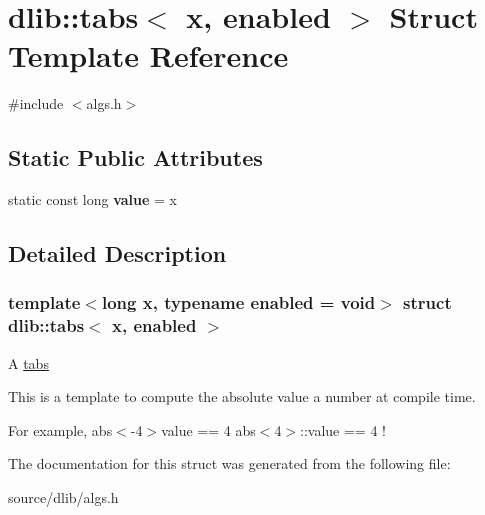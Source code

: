 \hypertarget{structdlib_1_1tabs}{
\section{dlib::tabs$<$ x, enabled $>$ Struct Template Reference}
\label{structdlib_1_1tabs}
}


{\ttfamily \#include $<$algs.h$>$}\subsection*{Static Public Attributes}
\begin{DoxyCompactItemize}
\item 
\hypertarget{structdlib_1_1tabs_a6752a89abdf005198b18f982eefb816f}{
static const long {\bfseries value} = x}
\label{structdlib_1_1tabs_a6752a89abdf005198b18f982eefb816f}

\end{DoxyCompactItemize}


\subsection{Detailed Description}
\subsubsection*{template$<$long x, typename enabled = void$>$ struct dlib::tabs$<$ x, enabled $>$}

A \hyperlink{structdlib_1_1tabs}{tabs}

This is a template to compute the absolute value a number at compile time.

For example, abs$<$-\/4$>$value == 4 abs$<$4$>$::value == 4 ! 

The documentation for this struct was generated from the following file:\begin{DoxyCompactItemize}
\item 
source/dlib/algs.h\end{DoxyCompactItemize}
